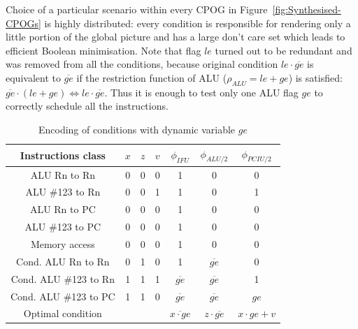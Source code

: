 Choice of a particular scenario within every CPOG in Figure~\ref{fig:Synthesised-CPOGs}
is highly distributed: every condition is responsible for rendering
only a little portion of the global picture and has a large don't
care set which leads to efficient Boolean minimisation. Note that
flag $le$ turned out to be redundant and was removed from all the
conditions, because original condition $le\cdot\overline{ge}$ is
equivalent to $\overline{ge}$ if the restriction function of ALU
($\rho_{ALU}=le+ge$) is satisfied: $\overline{ge}\cdot(le+ge)\Leftrightarrow le\cdot\overline{ge}$.
Thus it is enough to test only one ALU flag $ge$ to correctly schedule
all the instructions.

\begin{table}[b]
\begin{centering}
\begin{tabular}{|c||c|c|c||c|c|c|}
\hline 
Instructions class & $x$ & $z$ & $v$ & $\phi_{IFU}$ & $\phi_{ALU/2}$ & $\phi_{PCIU/2}$\tabularnewline
\hline 
\hline 
ALU Rn to Rn & 0 & 0 & 0 & 1 & 0 & 0\tabularnewline
\hline 
ALU \#123 to Rn & 0 & 0 & 1 & 1 & 0 & 1\tabularnewline
\hline 
ALU Rn to PC & 0 & 0 & 0 & 1 & 0 & 0\tabularnewline
\hline 
ALU \#123 to PC & 0 & 0 & 0 & 1 & 0 & 0\tabularnewline
\hline 
Memory access & 0 & 0 & 0 & 1 & 0 & 0\tabularnewline
\hline 
Cond. ALU Rn to Rn & 0 & 1 & 0 & 1 & $\overline{ge}$ & 0\tabularnewline
\hline 
Cond. ALU \#123 to Rn & 1 & 1 & 1 & $\overline{ge}$ & $\overline{ge}$ & 1\tabularnewline
\hline 
Cond. ALU \#123 to PC & 1 & 1 & 0 & $\overline{ge}$ & $\overline{ge}$ & $ge$\tabularnewline
\hline 
\hline 
Optimal condition & \multicolumn{3}{c|}{} & $\overline{x\cdot ge}$ & $z\cdot\overline{ge}$ & $x\cdot ge+v$\tabularnewline
\hline 
\end{tabular}
\par\end{centering}

\caption{Encoding of conditions with dynamic variable $ge$\label{app-tab-Encoding-of-non}}
\end{table}


